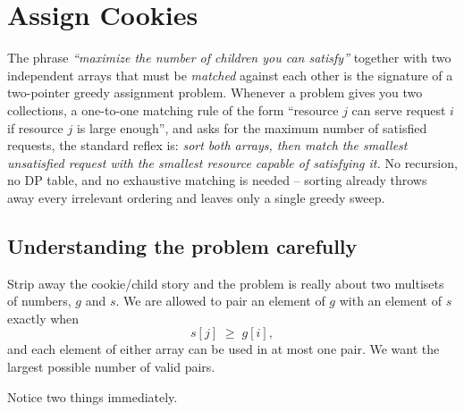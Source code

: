 \section{Assign Cookies}
\label{sec:assign-cookies}


\begin{patternbox}
The phrase \emph{``maximize the number of children you can satisfy''} together
with two independent arrays that must be \emph{matched} against each other is
the signature of a two-pointer greedy assignment problem. Whenever a problem
gives you two collections, a one-to-one matching rule of the form ``resource
$j$ can serve request $i$ if resource $j$ is large enough'', and asks for the
maximum number of satisfied requests, the standard reflex is: \emph{sort both
arrays, then match the smallest unsatisfied request with the smallest
resource capable of satisfying it.} No recursion, no DP table, and no
exhaustive matching is needed -- sorting already throws away every irrelevant
ordering and leaves only a single greedy sweep.
\end{patternbox}

\subsection*{Understanding the problem carefully}

Strip away the cookie/child story and the problem is really about two
multisets of numbers, $g$ and $s$. We are allowed to pair an element of $g$
with an element of $s$ exactly when
\[
  s[j] \;\ge\; g[i],
\]
and each element of either array can be used in at most one pair. We want the
largest possible number of valid pairs.

Notice two things immediately.


